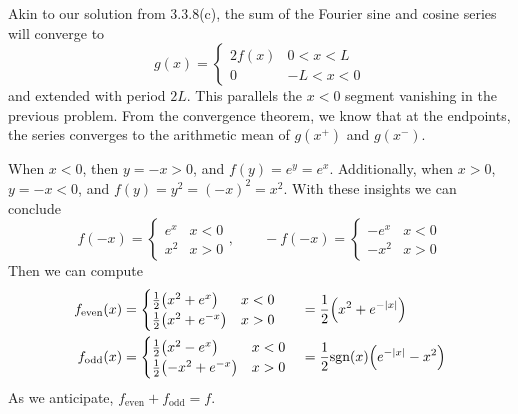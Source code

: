 \documentclass[a4paper]{article}
\begin{document}

Akin to our solution from 3.3.8(c), the sum of the Fourier sine and cosine series will converge to 
\[
	g \!\left( x \right) = \begin{cases}
		2f \!\left( x \right) & 0 < x < L \\
		0 & -L < x < 0
	\end{cases} 
\]
and extended with period \( 2L \). This parallels the \( x < 0 \) segment vanishing in the previous problem. From the convergence theorem, we know that at the endpoints, the series converges to the arithmetic mean of \( g \!\left( x^{+} \right) \) and \( g \!\left( x^{-} \right) \).

\vspace{12pt}


When \( x < 0 \), then \( y = -x > 0 \), and \( f \!\left( y \right) = e^{y} = e^{x} \). Additionally, when \( x > 0 \), \( y = -x < 0 \), and \( f \!\left( y \right) = y^{2} = \!\left( -x \right)^{2} = x^{2} \). With these insights we can conclude
\[
	f \!\left( -x \right) = \begin{cases}
		e^{x} & x < 0 \\
		x^{2} & x > 0 
	\end{cases}, \qquad 
	-f \!\left( -x \right) = \begin{cases}
		-e^{x} & x < 0 \\
		-x^{2} & x > 0 
	\end{cases}
\]
Then we can compute 
\begin{alignat*}{2}
	f_{\text{even}}\!\left( x \right) & = \begin{cases}
		\frac{1}{2}\!\left( x^{2} + e^{x} \right) & x < 0 \\
		\frac{1}{2}\!\left( x^{2} + e^{-x} \right) & x > 0 
	\end{cases} && = \frac{1}{2}\!\left( x^{2} + e^{-\abs{x}} \right) \\
	f_{\text{odd}}\!\left( x \right) & = \begin{cases}
		\frac{1}{2}\!\left( x^{2} - e^{x} \right) & x < 0 \\
		\frac{1}{2}\!\left( -x^{2} + e^{-x} \right) & x > 0 
	\end{cases} && = \frac{1}{2}\text{sgn}\!\left( x \right)\!\left( e^{-\abs{x}} - x^{2} \right)
\end{alignat*}
As we anticipate, \( f_{\text{even}} + f_{\text{odd}} = f \).
\end{document}
